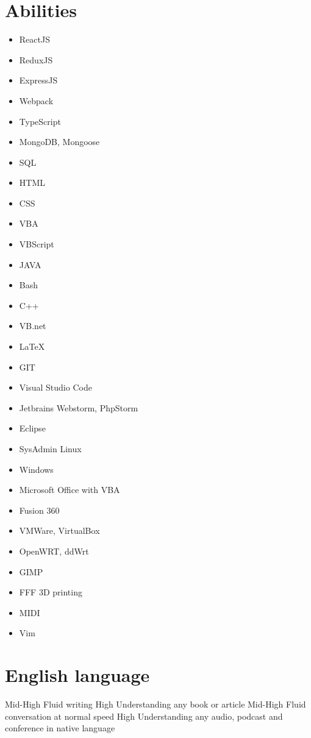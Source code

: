 \documentclass[draft,color,12pt,letterpaper,sans]{moderncv}
\begin{document}
\section{Abilities}
\begin{cvcolumns}
	{
		\begin{itemize}
			\item
				ReactJS
			\item
				ReduxJS
			\item
				ExpressJS
			\item
				Webpack
			\item
				TypeScript
			\item
				MongoDB, Mongoose
			\item
				SQL
			\item
				HTML
			\item
				CSS
			\item
				VBA
			\item	
				VBScript
			\item
				JAVA		
			\item
				Bash
			\item
				C++
			\item
				VB.net
			\item
				LaTeX
		\end{itemize}
	}
	

{
	\begin{itemize}
		\item
			GIT
		\item
			Visual Studio Code
		\item
			Jetbrains Webstorm, PhpStorm
		\item
			Eclipse
		\item
			SysAdmin Linux
		\item
			Windows
		\item
			Microsoft Office with VBA
		\item
			Fusion 360
		\item
			VMWare, VirtualBox
		\item
			OpenWRT, ddWrt
		\item
			GIMP
		\item
			FFF 3D printing
		\item
			MIDI
		\item	
			Vim
	\end{itemize}
}

\end{cvcolumns}



\newpage

\section{English language}
{Mid-High}
{Fluid writing}
{High}
{Understanding any book or article}
{Mid-High}
{Fluid conversation at normal speed}
{High}
{Understanding any audio, podcast and conference in native language}

\end{document}
